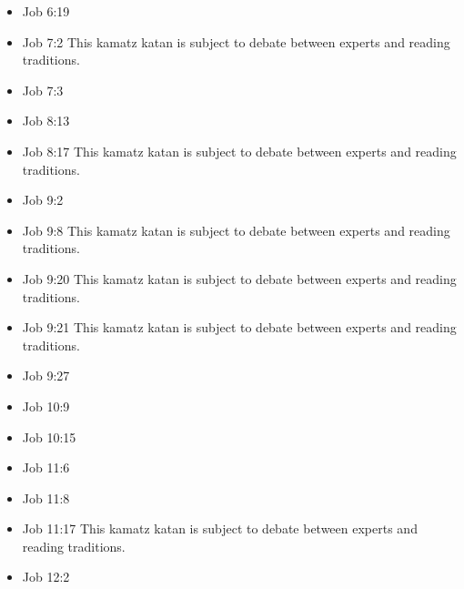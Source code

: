 \documentclass[14pt]{article}
\begin{document}
\begin{multicols}{2}
\begin{itemize}
									\item Job 6:19
									
									\item Job 7:2 This kamatz katan is subject to debate between experts and reading traditions.
									
									\item Job 7:3
									
									\item Job 8:13
									
									\item Job 8:17 This kamatz katan is subject to debate between experts and reading traditions.
									
									\item Job 9:2
									
									\item Job 9:8 This kamatz katan is subject to debate between experts and reading traditions.
									
									\item Job 9:20 This kamatz katan is subject to debate between experts and reading traditions.
									
									\item Job 9:21 This kamatz katan is subject to debate between experts and reading traditions.
									
									\item Job 9:27
									
									\item Job 10:9
									
									\item Job 10:15
									
									\item Job 11:6
											
											\item Job 11:8
											
											\item Job 11:17 This kamatz katan is subject to debate between experts and reading traditions.
											
											\item Job 12:2
											

\end{itemize}
\end{multicols}
\end{document}
